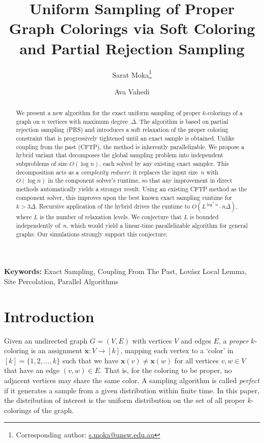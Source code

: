 \documentclass[12pt, a4paper]{article}
\title{Uniform Sampling of Proper Graph Colorings via Soft Coloring and Partial Rejection Sampling}
\author[1]{Sarat Moka\thanks{Corresponding author: \href{mailto:s.moka@unsw.edu.au}{s.moka@unsw.edu.au}}}
\author[2]{Ava Vahedi}
\affil[1]{School of Mathematics and Statistics, University of New South Wales, Sydney, Australia}
\affil[2]{Institute of Algebra, Dresden University of Technology, Dresden, Germany}
\theoremstyle{plain}
\theoremstyle{definition}
\theoremstyle{remark}
\renewcommand{\v}[1]{\boldsymbol{#1}}
\newcommand{\mx}{\v{x}}
\begin{document}
\maketitle

\begin{abstract}
We present a new algorithm for the exact uniform sampling of proper \(k\)-colorings of a graph on \(n\) vertices with maximum degree~\(\Delta\). The algorithm is based on partial rejection sampling (PRS) and introduces a soft relaxation of the proper coloring constraint that is progressively tightened until an exact sample is obtained. Unlike coupling from the past (CFTP), the method is inherently parallelizable. We propose a hybrid variant that decomposes the global sampling problem into independent subproblems of size \(O(\log n)\), each solved by any existing exact sampler. This decomposition acts as a {\em complexity reducer}: it replaces the input size~\(n\) with \(O(\log n)\) in the component solver's runtime, so that any improvement in direct methods automatically yields a stronger result. Using an existing CFTP method as the component solver, this improves upon the best known exact sampling runtime for \(k>3\Delta\). Recursive application of the hybrid drives the runtime to \(O(L^{\log^* n}\cdot n\Delta)\), where \(L\) is the number of relaxation levels. We conjecture that \(L\) is bounded independently of~\(n\), which would yield a linear-time parallelizable algorithm for general graphs. Our simulations strongly support this conjecture.
\end{abstract}
\textbf{Keywords:} Exact Sampling, Coupling From The Past, Lov\'{a}sz Local Lemma, Site Percolation, Parallel Algorithms

\section{Introduction}
\label{chp:intro}

Given an undirected graph \(G=(V,E) \) with vertices $V$ and edges $E$, a {\em proper} \(k\)-coloring is an assignment \(\mx:V\rightarrow [k]\), mapping each vertex to a `color' in $[k] = \{1, 2, \dots, k \}$ such that we have \(\mx(v)\neq\mx(w) \) for all vertices \(v, w\in V \) that have an edge \((v,w)\in E \). That is, for the coloring to be proper, no adjacent vertices may share the same color. A sampling algorithm is called {\em perfect} if it generates a sample from a given distribution within finite time. In this paper, the distribution of interest is the uniform distribution on the set of all proper \(k\)-colorings of the graph.
\end{document}
